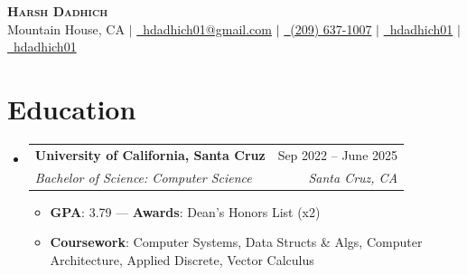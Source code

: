 \documentclass[letterpaper,11pt]{article}
\makeatletter
\newcommand{\resumeSubheading}[4]{
  \vspace{-2pt}\item
    \begin{tabular*}{0.97\textwidth}[t]{l@{\extracolsep{\fill}}r}
      \textbf{#1} & #2 \\
      \textit{\small#3} & \textit{\small #4} \\
    \end{tabular*}\vspace{-7pt}
}
\newcommand{\resumeSubHeadingListStart}{\begin{itemize}[leftmargin=0.15in, label={}]}
\newcommand{\resumeSubHeadingListEnd}{\end{itemize}}
\makeatother
\begin{document}

\vspace{-15pt}
\begin{center}
	\textbf{\Huge \scshape Harsh Dadhich} \\ \vspace{1pt}
	\small Mountain House, CA $|$
	\color[HTML]{0000EE}\href{mailto:hdadhich01@gmail.com}{\faEnvelope~hdadhich01@gmail.com} \textcolor{black}{$|$}
	\color[HTML]{0000EE}\href{tel:+12096371007}{\small \raisebox{-0.1\height}\faPhone~{(209) 637-1007}} \textcolor{black}{$|$}
	\color[HTML]{0000EE}\href{https://www.linkedin.com/in/hdadhich01/}{\faLinkedin~hdadhich01} \textcolor{black}{$|$}
	\color[HTML]{0000EE}\href{https://github.com/hdadhich01}{\faGithub~hdadhich01}
	\vspace{-15pt}
\end{center}

\section{Education}
\resumeSubHeadingListStart

\resumeSubheading
{University of California, Santa Cruz}{Sep 2022 -- June 2025}
{Bachelor of Science: Computer Science}{Santa Cruz, CA}
\begin{itemize}[itemsep=-1pt, parsep=1pt]
	\item\small \textbf{GPA}{: 3.79} --- \textbf{Awards}{: Dean's Honors List (x2)}
	\item\small \textbf{Coursework}{: Computer Systems, Data Structs \& Algs, Computer Architecture, Applied Discrete, Vector Calculus}
\end{itemize}

\resumeSubHeadingListEnd
\vspace{-15pt}

\end{document}
